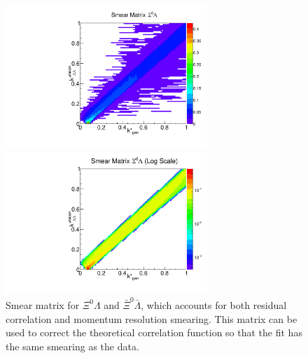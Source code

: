 \begin{figure}[h]
\begin{minipage}{18pc}
\includegraphics[width=18pc]{Figures/SmearMatrices/2016-7-19-SmearMatrixXi0LambdaNormLLAA.pdf}
\end{minipage}\hspace{2pc}
\begin{minipage}{18pc}
\includegraphics[width=18pc]{Figures/SmearMatrices/2016-7-19-SmearMatrixXi0LambdaNormLLAALog.pdf}
\end{minipage} 
\caption[Smear matrix -- $\Xi^0\Lambda$ and $\bar{\Xi}^0\bar{\Lambda}$]{
Smear matrix for $\Xi^0\Lambda$ and $\bar{\Xi}^0\bar{\Lambda}$, which accounts for both residual correlation and momentum resolution smearing. This matrix can be used to correct the theoretical correlation function so that the fit has the same smearing as the data.
}
\end{figure}

